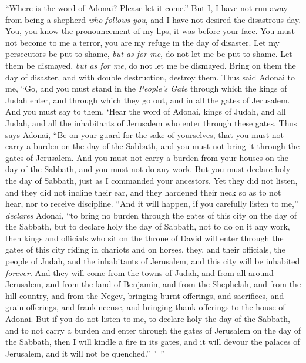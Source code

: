 \begin{biblechapter}
“Where is the word of Adonai? 
Please let it come.”
\verse But I, I have not run away from being a shepherd \textit{who follows you}, 
and I have not desired the disastrous day. 
You, you know the pronouncement of my lips, 
it was before your face.
\verse You must not become to me a terror, 
you are my refuge in the day of disaster.
\verse Let my persecutors be put to shame, 
\textit{but as for me}, do not let me be put to shame. 
Let them be dismayed, 
\textit{but as for me}, do not let me be dismayed. 
Bring on them the day of disaster, 
and with double destruction, destroy them.
 Thus said Adonai to me, “Go, and you must stand in the \textit{People’s Gate} through which the kings of Judah enter, and through which they go out, and in all the gates of Jerusalem.
\verse And you must say to them, ‘Hear the word of Adonai, kings of Judah, and all Judah, and all the inhabitants of Jerusalem who enter through these gates.
\verse Thus says Adonai, “Be on your guard for the sake of yourselves, that you must not carry a burden on the day of the Sabbath, and you must not bring it through the gates of Jerusalem.
\verse And you must not carry a burden from your houses on the day of the Sabbath, and you must not do any work. But you must declare holy the day of Sabbath, just as I commanded your ancestors.
\verse Yet they did not listen, and they did not incline their ear, and they hardened their neck so as to not hear, nor to receive discipline.
\verse “And it will happen, if you carefully listen to me,” \textit{declares} Adonai, “to bring no burden through the gates of this city on the day of the Sabbath, but to declare holy the day of Sabbath, not to do on it any work,
\verse then kings and officials who sit on the throne of David will enter through the gates of this city riding in chariots and on horses, they, and their officials, the people of Judah, and the inhabitants of Jerusalem, and this city will be inhabited \textit{forever}.
\verse And they will come from the towns of Judah, and from all around Jerusalem, and from the land of Benjamin, and from the Shephelah, and from the hill country, and from the Negev, bringing burnt offerings, and sacrifices, and grain offerings, and frankincense, and bringing thank offerings to the house of Adonai.
\verse But if you do not listen to me, to declare holy the day of the Sabbath, and to not carry a burden and enter through the gates of Jerusalem on the day of the Sabbath, then I will kindle a fire in its gates, and it will devour the palaces of Jerusalem, and it will not be quenched.” ’ ”
\end{biblechapter}

